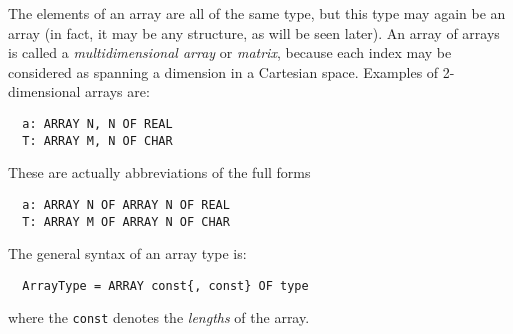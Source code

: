The elements of an array are all of the same type, but this type may again be an array
(in fact, it may be any structure, as will be seen later). An array of arrays is called a
\emph{multidimensional array} or \emph{matrix}, because each index may be considered as
spanning a dimension in a Cartesian space.  Examples of 2-dimensional arrays are:
\begin{verbatim}
  a: ARRAY N, N OF REAL
  T: ARRAY M, N OF CHAR
\end{verbatim}
These are actually abbreviations of the full forms
\begin{verbatim}
  a: ARRAY N OF ARRAY N OF REAL
  T: ARRAY M OF ARRAY N OF CHAR
\end{verbatim}
The general syntax of an array type is:
\begin{verbatim}
  ArrayType = ARRAY const{, const} OF type
\end{verbatim}
where the \verb|const| denotes the \emph{lengths} of the array.

